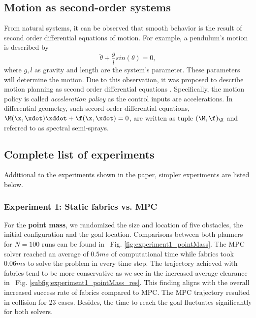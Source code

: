\appendix

\subsection{Motion as second-order systems}%
\label{app:sub:motion_as_second_order_systems}

From natural systems, it can be observed that smooth behavior is the result of second
order differential equations of motion. For example, a pendulum's motion is described by
\begin{equation}
  \ddot{\theta} + \frac{g}{l} sin(\theta) = 0, 
\end{equation}
where $g,l$ as gravity and length are the system's parameter. These parameters will determine
the motion. Due to this observation, it was proposed to describe motion planning as second
order differential equations \cite{Ratliff2020,Ratliff2018}. Specifically, the motion
policy is called \textit{acceleration policy} as the control inputs are accelerations.
In differential geometry,
such secord order differential equations, $\M(\x,\xdot)\xddot + \f(\x,\xdot) = 0$, are
written as tuple $(\M,\f)_{\X}$ and referred to as spectral semi-sprays.

\subsection{Complete list of experiments}%
\label{app:sec:complete_list_of_experiments}

Additional to the experiments shown in the paper, simpler experiments are listed below.


\subsubsection{Experiment 1: Static fabrics vs. MPC}%
\label{app:sub:experiment_1_static_fabrics_vs_mpc}

For the \textbf{point mass}, we randomized the size and location of five obstacles, the initial
configuration and the goal location. Comparisons between both planners for $N=100$ runs
can be found in ~{Fig. \ref{fig:experiment1_pointMass}}. The MPC solver reached an average of
$0.5ms$ of computational time while fabrics took $0.06ms$ to solve the problem in every
time step. The trajectory achieved with fabrics tend to be more conservative as we see in
the increased average clearance in ~{Fig. \ref{subfig:experiment1_pointMass_res}}. 
This finding aligns with the overall increased success rate of fabrics compared to MPC.
The MPC trajectory resulted in collision for 23 cases.
Besides, the time to reach the goal fluctuates significantly for both solvers.

